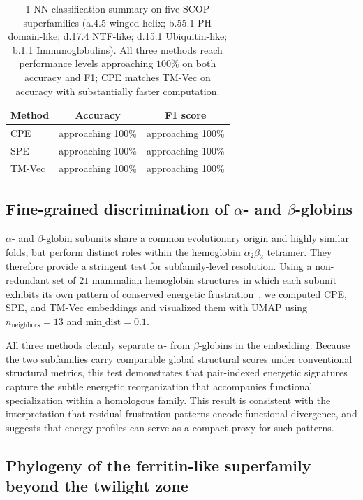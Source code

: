 \documentclass[11pt]{article}
\begin{document}
\begin{table}[t]
\centering
\caption{1-NN classification summary on five SCOP superfamilies
(a.4.5 winged helix; b.55.1 PH domain-like; d.17.4 NTF-like; d.15.1
Ubiquitin-like; b.1.1 Immunoglobulins). All three methods reach
performance levels approaching $100\%$ on both accuracy and F1; CPE
matches TM-Vec on accuracy with substantially faster computation.}
\label{tab:tab1}
\begin{tabular}{lcc}
\toprule
Method & Accuracy & F1 score \\
\midrule
CPE    & approaching 100\% & approaching 100\% \\
SPE    & approaching 100\% & approaching 100\% \\
TM-Vec & approaching 100\% & approaching 100\% \\
\bottomrule
\end{tabular}
\end{table}

\subsection{Fine-grained discrimination of $\alpha$- and $\beta$-globins}

$\alpha$- and $\beta$-globin subunits share a common evolutionary origin and
highly similar folds, but perform distinct roles within the hemoglobin
$\alpha_2 \beta_2$ tetramer. They therefore provide a stringent test for
subfamily-level resolution. Using a non-redundant set of $21$ mammalian
hemoglobin structures in which each subunit exhibits its own pattern of
conserved energetic frustration~\citep{freiberger2023frustration}, we
computed CPE, SPE, and TM-Vec embeddings and visualized them with UMAP
using $n_\text{neighbors}=13$ and $\text{min\_dist}=0.1$.

All three methods cleanly separate $\alpha$- from $\beta$-globins in the
embedding. Because the two subfamilies carry comparable global structural
scores under conventional structural metrics, this test demonstrates that
pair-indexed energetic signatures capture the subtle energetic
reorganization that accompanies functional specialization within a
homologous family. This result is consistent with the interpretation that
residual frustration patterns encode functional divergence, and suggests
that energy profiles can serve as a compact proxy for such patterns.

\subsection{Phylogeny of the ferritin-like superfamily beyond the twilight zone}
\end{document}
